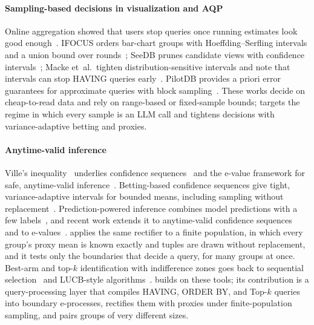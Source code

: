 \paragraph*{Sampling-based decisions in visualization and AQP}
Online aggregation showed that users stop queries once running estimates look good enough~\cite{ola}.
IFOCUS orders bar-chart groups with Hoeffding--Serfling intervals and a union bound over rounds~\cite{ifocus}; SeeDB prunes candidate views with confidence intervals~\cite{seedb}; Macke et~al.\ tighten distribution-sensitive intervals and note that intervals can stop HAVING queries early~\cite{macke2021}.
PilotDB provides a priori error guarantees for approximate queries with block sampling~\cite{pilotdb}.
These works decide on cheap-to-read data and rely on range-based or fixed-sample bounds; \sys{} targets the regime in which every sample is an LLM call and tightens decisions with variance-adaptive betting and proxies.

\paragraph*{Anytime-valid inference}
Ville's inequality~\cite{ville1939} underlies confidence sequences~\cite{darling1967,howard2021} and the e-value framework for safe, anytime-valid inference~\cite{shafer2021,ramdas2023savi,grunwald2024}.
Betting-based confidence sequences give tight, variance-adaptive intervals for bounded means, including sampling without replacement~\cite{wsr2024betting,wsr2020wor}.
Prediction-powered inference combines model predictions with a few labels~\cite{ppi}, and recent work extends it to anytime-valid confidence sequences~\cite{avppi} and to e-values~\cite{ppevalues}.
\sys{} applies the same rectifier to a finite population, in which every group's proxy mean is known exactly and tuples are drawn without replacement, and it tests only the boundaries that decide a query, for many groups at once.
Best-arm and top-$k$ identification with indifference zones goes back to sequential selection~\cite{bechhofer1954} and LUCB-style algorithms~\cite{lucb}.
\sys{} builds on these tools; its contribution is a query-processing layer that compiles HAVING, ORDER BY, and Top-$k$ queries into boundary e-processes, rectifies them with proxies under finite-population sampling, and pairs groups of very different sizes.
